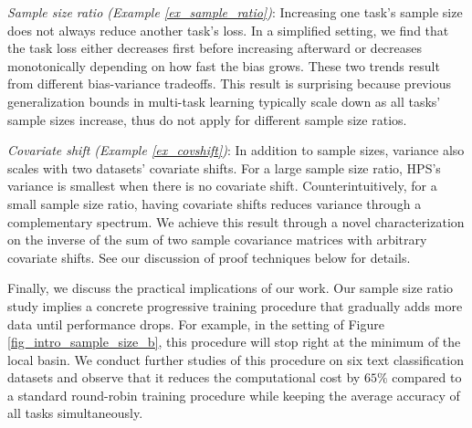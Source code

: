 	\item \textit{Sample size ratio (Example \ref{ex_sample_ratio})}: Increasing one task's sample size does not always reduce another task's loss. In a simplified setting, we find that the task loss either decreases first before increasing afterward or decreases monotonically depending on how fast the bias grows. These two trends result from different bias-variance tradeoffs. This result is surprising because previous generalization bounds in multi-task learning typically scale down as all tasks' sample sizes increase, thus do not apply for different sample size ratios.

	\item \textit{Covariate shift (Example \ref{ex_covshift})}: In addition to sample sizes, variance also scales with two datasets' covariate shifts. For a large sample size ratio, HPS's  variance is smallest when there is no covariate shift. Counterintuitively, for a small sample size ratio, having covariate shifts reduces variance through a complementary spectrum. We achieve this result through a novel characterization on the inverse of the sum of two sample covariance matrices with arbitrary covariate shifts. See our discussion of proof techniques below for details.


Finally, we discuss the practical implications of our work.
Our sample size ratio study implies a concrete progressive training procedure that gradually adds more data until performance drops.
For example, in the setting of Figure \ref{fig_intro_sample_size_b}, this procedure will stop right at the minimum of the local basin.
We conduct further studies of this procedure on six text classification datasets and observe that it reduces the computational cost by $65\%$ compared to a standard round-robin training procedure while keeping the average accuracy of all tasks simultaneously.

